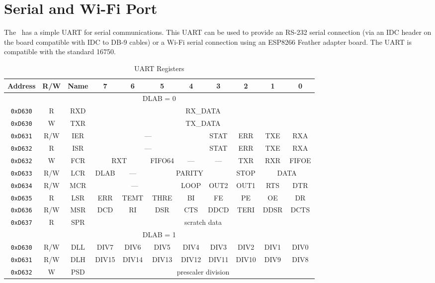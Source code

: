 \chapter{Serial and Wi-Fi Port}

The \jr\ has a simple UART for serial communications. This UART can be used to provide an RS-232 serial connection (via an IDC header on the board compatible with IDC to DB-9 cables) or a Wi-Fi serial connection using an ESP8266 Feather adapter board. The UART is compatible with the standard 16750.

\begin{table}[ht]
    \begin{center}
        \begin{tabular}{|c|c|c|c|c|c|c|c|c|c|c|} \hline
            Address & R/W & Name & 7 & 6 & 5 & 4 & 3 & 2 & 1 & 0 \\\hline\hline
            \multicolumn{11}{|c|}{DLAB = 0} \\ \hline
            \verb+0xD630+ & R & RXD & \multicolumn{8}{|c|}{RX\_DATA} \\ \hline
            \verb+0xD630+ & W & TXR & \multicolumn{8}{|c|}{TX\_DATA} \\ \hline
            \verb+0xD631+ & R/W & IER & \multicolumn{4}{|c|}{---} & STAT & ERR & TXE & RXA \\ \hline
            \verb+0xD632+ & R & ISR & \multicolumn{4}{|c|}{---} & STAT & ERR & TXE & RXA \\ \hline
            \verb+0xD632+ & W & FCR & \multicolumn{2}{|c|}{RXT} & FIFO64 & --- & --- & TXR & RXR & FIFOE \\ \hline
            \verb+0xD633+ & R/W & LCR & DLAB & --- & \multicolumn{3}{|c|}{PARITY} & STOP & \multicolumn{2}{|c|}{DATA} \\ \hline
            \verb+0xD634+ & R/W & MCR & \multicolumn{3}{|c|}{---} & LOOP & OUT2 & OUT1 & RTS & DTR \\ \hline
            \verb+0xD635+ & R & LSR & ERR & TEMT & THRE & BI & FE & PE & OE & DR \\ \hline
            \verb+0xD636+ & R/W & MSR & DCD & RI & DSR & CTS & DDCD & TERI & DDSR & DCTS \\ \hline
            \verb+0xD637+ & R & SPR & \multicolumn{8}{|c|}{scratch data} \\ \hline\hline

            \multicolumn{11}{|c|}{DLAB = 1} \\ \hline
            \verb+0xD630+ & R/W & DLL & DIV7 & DIV6 & DIV5 & DIV4 & DIV3 & DIV2 & DIV1 & DIV0 \\ \hline
            \verb+0xD631+ & R/W & DLH & DIV15 & DIV14 & DIV13 & DIV12 & DIV11 & DIV10 & DIV9 & DIV8 \\ \hline
            \verb+0xD632+ & W & PSD & \multicolumn{8}{|c|}{prescaler division} \\ \hline
        \end{tabular}
    \end{center}
    \caption{UART Registers}
    \label{tab:uart_reg}
\end{table}

